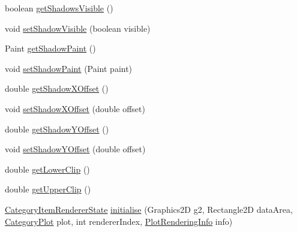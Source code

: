 \begin{DoxyCompactItemize}
boolean \mbox{\hyperlink{classorg_1_1jfree_1_1chart_1_1renderer_1_1category_1_1_bar_renderer_ad8187f4f86eac0cb615f782edc2d6f05}{get\+Shadows\+Visible}} ()
\item 
void \mbox{\hyperlink{classorg_1_1jfree_1_1chart_1_1renderer_1_1category_1_1_bar_renderer_acff51b6f76e546d3df309c2521051b5a}{set\+Shadow\+Visible}} (boolean visible)
\item 
Paint \mbox{\hyperlink{classorg_1_1jfree_1_1chart_1_1renderer_1_1category_1_1_bar_renderer_adf1357a6926c8a92fa990e486e68913e}{get\+Shadow\+Paint}} ()
\item 
void \mbox{\hyperlink{classorg_1_1jfree_1_1chart_1_1renderer_1_1category_1_1_bar_renderer_a374cb539bacc8cfffc407bae73a38d6d}{set\+Shadow\+Paint}} (Paint paint)
\item 
double \mbox{\hyperlink{classorg_1_1jfree_1_1chart_1_1renderer_1_1category_1_1_bar_renderer_a3766dead9f1dc99b9841cc38c63639d1}{get\+Shadow\+X\+Offset}} ()
\item 
void \mbox{\hyperlink{classorg_1_1jfree_1_1chart_1_1renderer_1_1category_1_1_bar_renderer_a9b1cb42010a0e165924f813bd4a06043}{set\+Shadow\+X\+Offset}} (double offset)
\item 
double \mbox{\hyperlink{classorg_1_1jfree_1_1chart_1_1renderer_1_1category_1_1_bar_renderer_a33ed75b5d8fba115288a43bdeea94949}{get\+Shadow\+Y\+Offset}} ()
\item 
void \mbox{\hyperlink{classorg_1_1jfree_1_1chart_1_1renderer_1_1category_1_1_bar_renderer_a6868a61ce0dd3674d8efcb396f799e34}{set\+Shadow\+Y\+Offset}} (double offset)
\item 
double \mbox{\hyperlink{classorg_1_1jfree_1_1chart_1_1renderer_1_1category_1_1_bar_renderer_abe599e2fca708704a3657e74f4533eed}{get\+Lower\+Clip}} ()
\item 
double \mbox{\hyperlink{classorg_1_1jfree_1_1chart_1_1renderer_1_1category_1_1_bar_renderer_aa69a33346be9475b2d873db59f31ad7e}{get\+Upper\+Clip}} ()
\item 
\mbox{\hyperlink{classorg_1_1jfree_1_1chart_1_1renderer_1_1category_1_1_category_item_renderer_state}{Category\+Item\+Renderer\+State}} \mbox{\hyperlink{classorg_1_1jfree_1_1chart_1_1renderer_1_1category_1_1_bar_renderer_a6e4d149cf05c5661c9b6d2d748ceba36}{initialise}} (Graphics2D g2, Rectangle2D data\+Area, \mbox{\hyperlink{classorg_1_1jfree_1_1chart_1_1plot_1_1_category_plot}{Category\+Plot}} plot, int renderer\+Index, \mbox{\hyperlink{classorg_1_1jfree_1_1chart_1_1plot_1_1_plot_rendering_info}{Plot\+Rendering\+Info}} info)
\item 

\end{DoxyCompactItemize}
